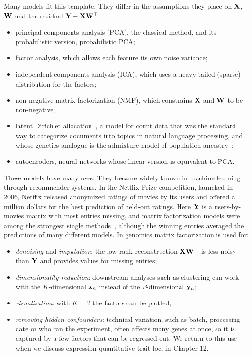 Many models fit this template. They differ in the assumptions they place on $\mathbf{X}$, $\mathbf{W}$ and the residual $\mathbf{Y}-\mathbf{X}\mathbf{W}^\top$:
\begin{itemize}
  \item principal components analysis (PCA), the classical method, and its probabilistic version, probabilistic PCA;
  \item factor analysis, which allows each feature its own noise variance;
  \item independent components analysis (ICA), which uses a heavy-tailed (sparse) distribution for the factors;
  \item non-negative matrix factorization (NMF), which constrains $\mathbf{X}$ and $\mathbf{W}$ to be non-negative;
  \item latent Dirichlet allocation~\citep{blei2003}, a model for count data that was the standard way to categorize documents into topics in natural language processing, and whose genetics analogue is the admixture model of population ancestry~\citep{pritchard2000};
  \item autoencoders, neural networks whose linear version is equivalent to PCA.
\end{itemize}

These models have many uses. They became widely known in machine learning through recommender systems. In the Netflix Prize competition, launched in 2006, Netflix released anonymized ratings of movies by its users and offered a million dollars for the best prediction of held-out ratings. Here $\mathbf{Y}$ is a users-by-movies matrix with most entries missing, and matrix factorization models were among the strongest single methods~\citep{koren2009}, although the winning entries averaged the predictions of many different models. In genomics matrix factorization is used for:
\begin{itemize}
  \item \emph{denoising} and \emph{imputation}: the low-rank reconstruction $\mathbf{X}\mathbf{W}^\top$ is less noisy than $\mathbf{Y}$ and provides values for missing entries;
  \item \emph{dimensionality reduction}: downstream analyses such as clustering can work with the $K$-dimensional $\mathbf{x}_n$ instead of the $P$-dimensional $\mathbf{y}_n$;
  \item \emph{visualization}: with $K=2$ the factors can be plotted;
  \item \emph{removing hidden confounders}: technical variation, such as batch, processing date or who ran the experiment, often affects many genes at once, so it is captured by a few factors that can be regressed out. We return to this use when we discuss expression quantitative trait loci in Chapter 12.
\end{itemize}

